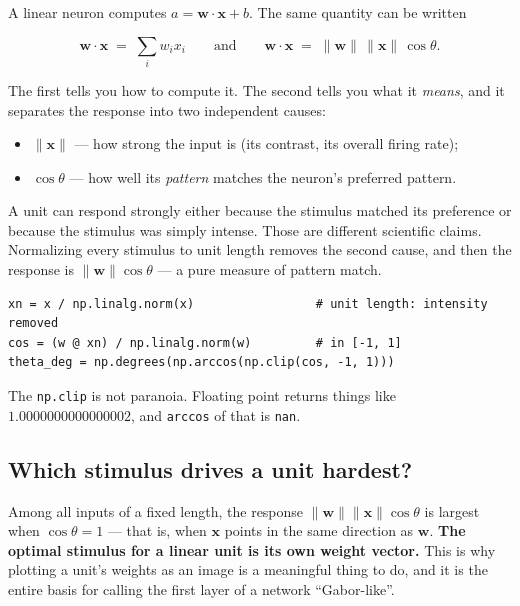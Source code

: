 \documentclass[11pt]{article}
\begin{document}
A linear neuron computes $a = \boldsymbol{w}\cdot\boldsymbol{x} + b$. The same
quantity can be written

\[
\boldsymbol{w}\cdot\boldsymbol{x} \;=\; \sum_i w_i x_i
\qquad\text{and}\qquad
\boldsymbol{w}\cdot\boldsymbol{x} \;=\; \|\boldsymbol{w}\|\,\|\boldsymbol{x}\|\,\cos\theta .
\]

The first tells you how to compute it. The second tells you what it \emph{means},
and it separates the response into two independent causes:

\begin{itemize}
  \item $\|\boldsymbol{x}\|$ --- how strong the input is (its contrast, its
        overall firing rate);
  \item $\cos\theta$ --- how well its \emph{pattern} matches the neuron's
        preferred pattern.
\end{itemize}

\begin{keybox}
 A unit can respond strongly either because the stimulus
matched its preference or because the stimulus was simply intense. Those are
different scientific claims. Normalizing every stimulus to unit length removes
the second cause, and then the response is $\|\boldsymbol{w}\|\cos\theta$ --- a
pure measure of pattern match.
\end{keybox}

\begin{lstlisting}
xn = x / np.linalg.norm(x)                 # unit length: intensity removed
cos = (w @ xn) / np.linalg.norm(w)         # in [-1, 1]
theta_deg = np.degrees(np.arccos(np.clip(cos, -1, 1)))
\end{lstlisting}

The \texttt{np.clip} is not paranoia. Floating point returns things like
$1.0000000000000002$, and \texttt{arccos} of that is \texttt{nan}.

\subsection{Which stimulus drives a unit hardest?}

Among all inputs of a fixed length, the response
$\|\boldsymbol{w}\|\|\boldsymbol{x}\|\cos\theta$ is largest when $\cos\theta=1$
--- that is, when $\boldsymbol{x}$ points in the same direction as
$\boldsymbol{w}$. \textbf{The optimal stimulus for a linear unit is its own
weight vector.} This is why plotting a unit's weights as an image is a
meaningful thing to do, and it is the entire basis for calling the first layer
of a network ``Gabor-like''.
\end{document}
